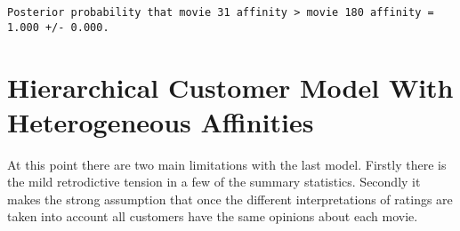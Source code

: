 \documentclass[
  letterpaper,
  DIV=11,
  numbers=noendperiod]{scrartcl}
\newenvironment{Shaded}{\begin{snugshade}}{\end{snugshade}}
\newcommand{\ControlFlowTok}[1]{\textcolor[rgb]{0.00,0.23,0.31}{#1}}
\newcommand{\DecValTok}[1]{\textcolor[rgb]{0.68,0.00,0.00}{#1}}
\newcommand{\FunctionTok}[1]{\textcolor[rgb]{0.28,0.35,0.67}{#1}}
\newcommand{\NormalTok}[1]{\textcolor[rgb]{0.00,0.23,0.31}{#1}}
\newcommand{\OtherTok}[1]{\textcolor[rgb]{0.00,0.23,0.31}{#1}}
\newcommand{\SpecialCharTok}[1]{\textcolor[rgb]{0.37,0.37,0.37}{#1}}
\newcommand{\StringTok}[1]{\textcolor[rgb]{0.13,0.47,0.30}{#1}}
\begin{document}
\begin{Shaded}
\end{Shaded}

\begin{verbatim}
Posterior probability that movie 31 affinity > movie 180 affinity = 1.000 +/- 0.000.
\end{verbatim}

\section{Hierarchical Customer Model With Heterogeneous
Affinities}\label{hierarchical-customer-model-with-heterogeneous-affinities}

At this point there are two main limitations with the last model.
Firstly there is the mild retrodictive tension in a few of the summary
statistics. Secondly it makes the strong assumption that once the
different interpretations of ratings are taken into account all
customers have the same opinions about each movie.
\end{document}
